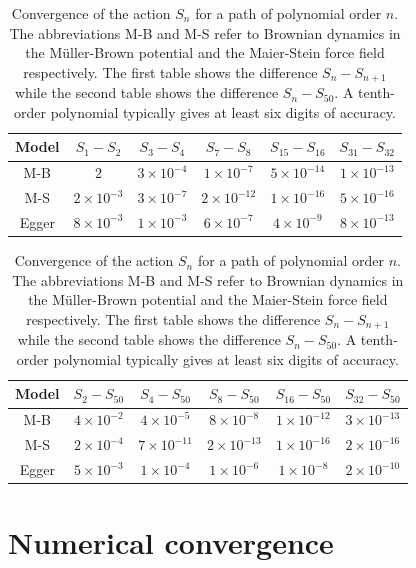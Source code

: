 \begin{table}
\begin{centering}

\begin{tabular}{|c|c|c|c|c|c|}
\hline 
Model & $S_{1}-S_{2}$ & $S_{3}-S_{4}$ & $S_{7}-S_{8}$ & $S_{15}-S_{16}$ & $S_{31}-S_{32}$\tabularnewline
\hline 
\hline 
M-B & $2$ & $3\times10^{-4}$ & $1\times10^{-7}$ & $5\times10^{-14}$ & $1\times10^{-13}$\tabularnewline
\hline 
M-S & $2\times10^{-3}$ & $3\times10^{-7}$ & $2\times10^{-12}$ & $1\times10^{-16}$ & $5\times10^{-16}$\tabularnewline
\hline 
Egger & $8\times10^{-3}$ & $1\times10^{-3}$ & $6\times10^{-7}$ & $4\times10^{-9}$ & $8\times10^{-13}$\tabularnewline
\hline 
\end{tabular}%

\vspace{0.2cm}

\begin{tabular}{|c|c|c|c|c|c|}
\hline 
Model & $S_{2}-S_{50}$ & $S_{4}-S_{50}$ & $S_{8}-S_{50}$ & $S_{16}-S_{50}$ & $S_{32}-S_{50}$\tabularnewline
\hline 
\hline 
M-B & $4\times10^{-2}$ & $4\times10^{-5}$ & $8\times10^{-8}$ & $1\times10^{-12}$ & $3\times10^{-13}$\tabularnewline
\hline 
M-S & $2\times10^{-4}$ & $7\times10^{-11}$ & $2\times10^{-13}$ & $1\times10^{-16}$ & $2\times10^{-16}$\tabularnewline
\hline 
Egger & $5\times10^{-3}$ & $1\times10^{-4}$ & $1\times10^{-6}$ & $1\times10^{-8}$ & $2\times10^{-10}$\tabularnewline
\hline 
\end{tabular}

\par\end{centering}
\caption{Convergence of the action $S_{n}$ for a path of polynomial order
$n$. The abbreviations M-B and M-S refer to Brownian dynamics in
the Müller-Brown potential and the Maier-Stein force field respectively.
The first table shows the difference $S_{n}-S_{n+1}$ while
the second table shows the difference $S_{n}-S_{50}$. A tenth-order polynomial
typically gives at least six digits of accuracy. \textcolor{red}{\label{tab:Convergence}}}
\end{table}

\section{Numerical convergence}

